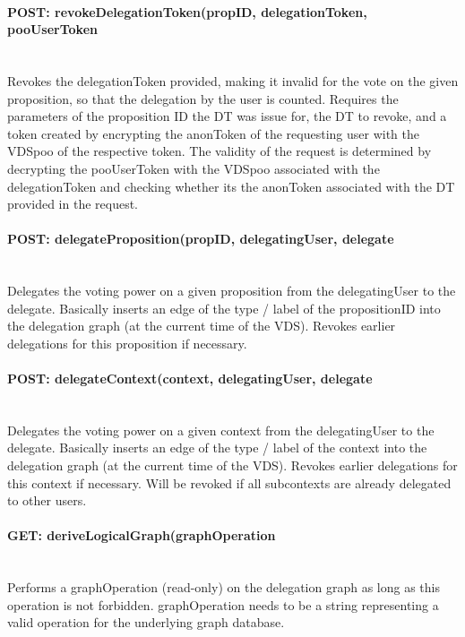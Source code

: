 \paragraph*{POST: revokeDelegationToken(propID, delegationToken, pooUserToken} \mbox{} \\
Revokes the delegationToken provided, making it invalid for the vote on the given proposition, so that the delegation by the user is counted. Requires the parameters of the proposition ID the DT was issue for, the DT to revoke, and a token created by encrypting the anonToken of the requesting user with the VDSpoo of the respective token.
The validity of the request is determined by decrypting the pooUserToken with the VDSpoo associated with the delegationToken and checking whether its the anonToken associated with the DT provided in the request.

\paragraph*{POST: delegateProposition(propID, delegatingUser, delegate} \mbox{} \\
Delegates the voting power on a given proposition from the delegatingUser to the delegate. Basically inserts an edge of the type / label of the propositionID into the delegation graph (at the current time of the VDS). Revokes earlier delegations for this proposition if necessary.

\paragraph*{POST: delegateContext(context, delegatingUser, delegate} \mbox{} \\
Delegates the voting power on a given context from the delegatingUser to the delegate. Basically inserts an edge of the type / label of the context into the delegation graph (at the current time of the VDS). Revokes earlier delegations for this context if necessary. 
Will be revoked if all subcontexts are already delegated to other users.

\paragraph*{GET: deriveLogicalGraph(graphOperation} \mbox{} \\
Performs a graphOperation (read-only) on the delegation graph as long as this operation is not forbidden.
graphOperation needs to be a string representing a valid operation for the underlying graph database.

